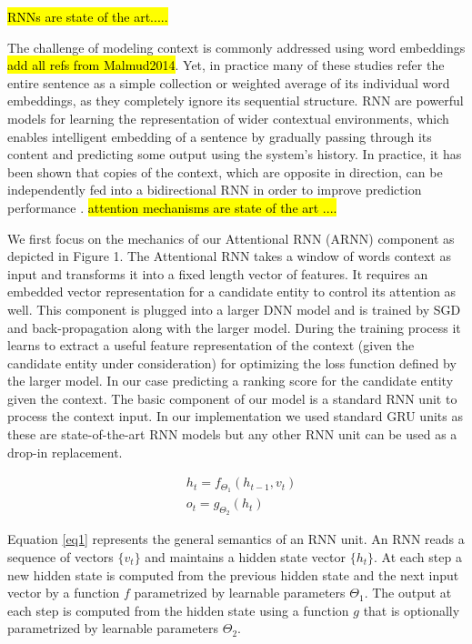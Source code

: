 \documentclass[11pt]{article}
\begin{document}
	\hl{RNNs are state of the art..... }
	
	The challenge of modeling context is commonly addressed using word embeddings \cite{} \hl{add all refs from Malmud2014}. Yet, in practice many of these studies refer the entire sentence as a simple collection or weighted average of its individual word embeddings, as they completely ignore its sequential structure. RNN are powerful models for learning the representation of wider contextual environments, which enables intelligent embedding of a sentence by gradually passing through its content and predicting some output using the system's history. In practice, it has been shown that copies of the context, which are opposite in direction, can be independently fed into a bidirectional RNN in order to improve prediction performance \cite{Munich2004c,Melamud2014a}. 
	\hl{attention mechanisms are state of the art ....}
	
	We first focus on the mechanics of our Attentional RNN (ARNN) component as depicted in Figure 1. The Attentional RNN takes a window of words context as input and transforms it into a fixed length vector of features. It requires an embedded vector representation for a candidate entity to control its attention as well. This component is plugged into a larger DNN model and is trained by SGD and back-propagation along with the larger model. During the training process it learns to extract a useful feature representation of the context (given the candidate entity under consideration) for optimizing the loss function defined by the larger model. In our case predicting a ranking score for the candidate entity given the context.
	The basic component of our model is a standard RNN unit to process the context input. In our implementation we used standard GRU units \cite{cho2014learning} as these are state-of-the-art RNN models but any other RNN unit can be used as a drop-in replacement. 
	
	\begin{equation}
	\label{eq1}
	\begin{aligned}
	& h_t=f_{\Theta_1}(h_{t-1}, v_t) \\
	& o_t=g_{\Theta_2}(h_t)
	\end{aligned}
	\end{equation}
	
	Equation \ref{eq1} represents the general semantics of an RNN unit. An RNN reads a sequence of vectors $\{v_t\}$ and maintains a hidden state vector $\{h_t\}$. At each step a new hidden state is computed from the previous hidden state and the next input vector by a function $f$ parametrized by learnable parameters $\Theta_1$. The output at each step is computed from the hidden state using a function $g$ that is optionally parametrized by learnable parameters $\Theta_2$. 
	
\end{document}
